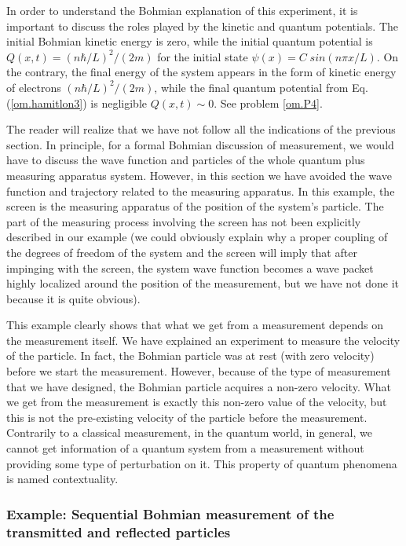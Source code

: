 \documentclass[nofootinbib, secnumarabic, amsmath, nobibnotes,11pt,aps,pra, floatfix]{revtex4-1}
\newcommand{\eref}[1]{Eq. (\ref{#1})}
\begin{document}
In order to understand the Bohmian explanation of this experiment, it is important to discuss the roles played by the kinetic and quantum potentials. The initial Bohmian kinetic energy is zero, while the initial quantum potential is $Q(x,t) = (n\hbar/L)^{2}/(2m)$ for the initial state $\psi(x) = C \; sin(n \pi x/L)$. On the contrary, the final energy of the system appears in the form of kinetic energy of electrons $(n\hbar/L)^{2}/(2m)$, while the final quantum potential from \eref{om.hamitlon3} is negligible $Q(x,t)\sim 0$. See problem \ref{om.P4}.

The reader will realize that we have not follow all the indications of the previous section. In principle, for a formal Bohmian
discussion of measurement, we would have to discuss the wave function and particles of the whole quantum plus measuring apparatus system. However, in this section we have avoided the wave function and trajectory related to the measuring apparatus. In this example, the screen is the measuring apparatus of the position of the system's particle. The part of the measuring process involving the screen has not been explicitly described in our example (we could obviously explain why a proper coupling of the degrees of freedom of the system and the screen will imply that after impinging with the screen, the system wave function becomes a wave packet highly localized around the position of the measurement, but we have not done it because it is quite obvious). 

This example clearly shows that what we get from a measurement depends on the measurement itself. We have explained an experiment to measure the velocity of the particle. In fact, the Bohmian particle was at rest (with zero velocity) before we start the measurement. However, because of the type of measurement that we have designed, the Bohmian particle acquires a non-zero velocity. What we get from the measurement is exactly this non-zero value of the velocity, but this is not the pre-existing velocity of the particle before the measurement. Contrarily to a classical measurement, in the quantum world, in general, we cannot get information of a quantum system from a  measurement without providing some type of perturbation on it. This property of quantum phenomena is named contextuality. 

\enlargethispage{13pt}
\subsubsection{Example: Sequential Bohmian measurement of the transmitted and reflected particles}
\label{om.measure_transmission}
\end{document}
